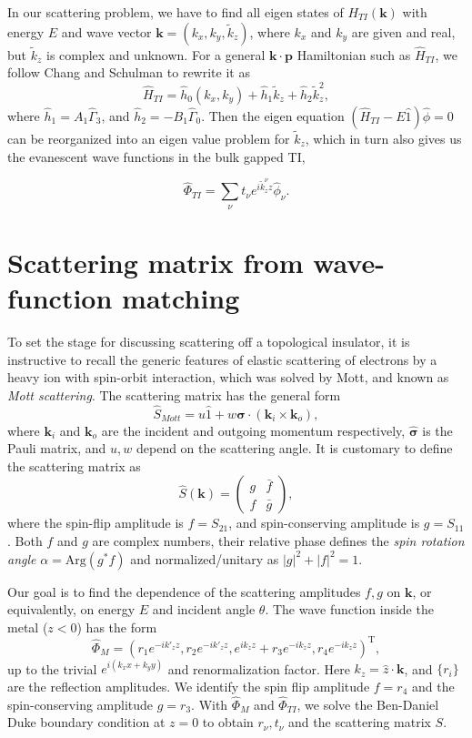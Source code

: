 \documentclass[12pt,twocolumn]{article}
\def\v#1{\mathbf{#1}}
\begin{document}
In our scattering problem, we have to find all eigen states of $H_{TI}(\v{k})$ with energy $E$ and 
wave vector $\v{k}=(k_x,k_y,\tilde{k}_z)$, where $k_x$ and $k_y$ are given and real, but $\tilde{k}_z$ is 
complex and unknown. For a general $\mathbf{k\cdot p}$ Hamiltonian such as $\hat{H}_{TI}$, 
we follow Chang and Schulman \cite{chang82} to rewrite it as
\[
\hat{H}_{TI}=\hat{h}_0(k_x,k_y)+\hat{h}_1 \tilde{k}_z+\hat{h}_2\tilde{k}^2_z,
\]
where $\hat{h}_1=A_1\hat{\Gamma}_3$, and $\hat{h}_2=-B_1\hat{\Gamma}_0$. 
Then the eigen equation $(\hat{H}_{TI}-E\hat{1})\hat{\phi}=0$ can be reorganized into an 
eigen value problem for $\tilde{k}_z$, which in turn also gives us the evanescent wave functions in the bulk gapped TI,

\[
\hat{\Phi}_{TI}=\sum_{\nu} t_\nu e^{i\tilde{k}^\nu_z z} \hat{\phi}_\nu.
\]

\section{Scattering matrix from wave-function matching} 

To set the stage for discussing scattering off a topological insulator, it is instructive to recall the generic features of elastic scattering of electrons by a heavy ion with spin-orbit interaction, which was solved by Mott, and known as {\it Mott scattering}. 
The scattering matrix has the general form \cite{mott}
\[
\hat{S}_{Mott}=u\hat{1}+w\hat{\mathbf{\sigma}}\cdot (\mathbf{k}_{i}\times \mathbf{k}_{o}),
\]
where $\mathbf{k}_{i}$ and $\mathbf{k}_{o}$ are the incident and outgoing momentum respectively, $\hat{\mathbf{\sigma}}$ is the Pauli matrix, and $u,w$ depend on the scattering angle. It is customary to
define the scattering matrix as 
\[
\hat{S}(\v{k})=\left(
\begin{array}{ll}
  g & \bar{f}   \\
  f & \bar{g}
  \end{array}
\right),
\]
where the spin-flip amplitude is $f=S_{21}$, and spin-conserving amplitude is $g=S_{11}$. 
Both $f$ and $g$ are complex numbers, their relative phase defines the {\it spin rotation angle} $\alpha=\mathrm{Arg}(g^*f)$ and normalized/unitary as $|g|^2+|f|^2=1$. 


Our goal is to find the dependence of the scattering amplitudes $f,g$ on $\v{k}$, or equivalently, on energy $E$ and 
incident angle $\theta$. 
The wave function inside the metal ($z<0$) has the form
\[
\hat{\Phi}_M=(r_1e^{-ik'_{z} z},r_2e^{-ik'_{z}z},e^{ik_{z}z}+r_3 e^{-ik_{z}z} ,r_4 e^{-ik_{z}z})^{\mathrm{T}},
\]
up to the trivial $e^{i(k_x x+k_y y)}$ and renormalization factor.
Here $k_z=\hat{z}\cdot\v{k}$, and $\{r_i\}$ are the reflection amplitudes. We identify 
the spin flip amplitude $f=r_4$ and the spin-conserving amplitude $g=r_3$. With $\hat{\Phi}_{M}$ and $\hat{\Phi}_{TI}$, we solve the Ben-Daniel Duke boundary condition at $z=0$ 
to obtain $r_\nu, t_\nu$ and the scattering matrix $S$. 
\end{document}
